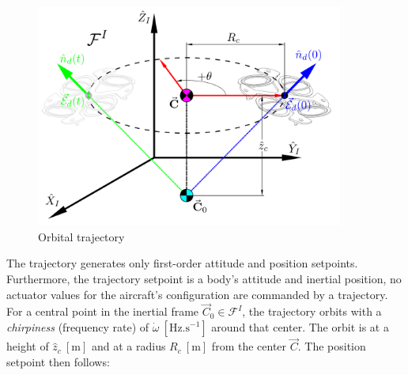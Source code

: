 \begin{figure}[htbp]
\vspace{-10pt}
\centering
\includegraphics[width=0.9\textwidth]{figs/trajectory}
\vspace{-12pt}
\caption{Orbital trajectory}
\label{fig:trajectory}
\vspace{-20pt}
\end{figure}
\par
The trajectory generates only first-order attitude and position setpoints. Furthermore, the trajectory setpoint is a body's attitude and inertial position, no actuator values for the aircraft's configuration are commanded by a trajectory. For a central point in the inertial frame $\vec{C}_0\in\mathcal{F}^I$, the trajectory orbits with a \emph{chirpiness} (frequency rate) of $\dot{\omega}~[\text{Hz.s}^{-1}]$ around that center. The orbit is at a height of $\hat{z}_c~[\text{m}]$ and at a radius $R_c~[\text{m}]$ from the center $\vec{C}$. The position setpoint then follows:
